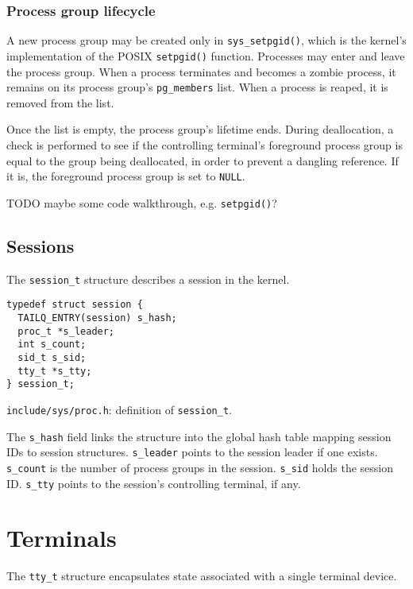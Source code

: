 \documentclass[shortabstract, manyadvisors, english, mgr]{iithesis}
\begin{document}
\subsubsection{Process group lifecycle}

A new process group may be created only in \texttt{sys\_setpgid()}, which is the
kernel's implementation of the POSIX \texttt{setpgid()} function. Processes may
enter and leave the process group. When a process terminates and becomes a
zombie process, it remains on its process group's \texttt{pg\_members} list.
When a process is reaped, it is removed from the list.

Once the list is empty, the process group's lifetime ends. During deallocation,
a check is performed to see if the controlling terminal's foreground process
group is equal to the group being deallocated, in order to prevent a dangling
reference. If it is, the foreground process group is set to \texttt{NULL}.

TODO maybe some code walkthrough, e.g. \texttt{setpgid()}?

\subsection{Sessions}\label{chapter:sessions}

The \texttt{session\_t} structure describes a session in the kernel.

\begin{listing}[H]
\begin{verbatim}
typedef struct session {
  TAILQ_ENTRY(session) s_hash;
  proc_t *s_leader;
  int s_count;
  sid_t s_sid;
  tty_t *s_tty;
} session_t;
\end{verbatim}
\caption{\texttt{include/sys/proc.h}: definition of \texttt{session\_t}.}
\end{listing}
The \texttt{s\_hash} field links the structure into the global hash table
mapping session IDs to session structures. \texttt{s\_leader} points to the
session leader if one exists. \texttt{s\_count} is the number of process groups
in the session. \texttt{s\_sid} holds the session ID. \texttt{s\_tty} points to
the session's controlling terminal, if any.

\section{Terminals}

The \texttt{tty\_t} structure encapsulates state associated with a single
terminal device.
\end{document}
